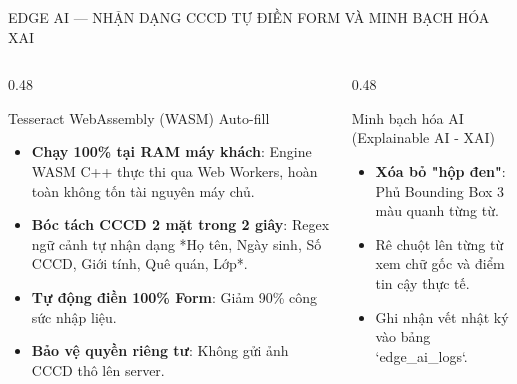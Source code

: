\documentclass[aspectratio=169, 10pt]{beamer}
\begin{document}
\begin{frame}{EDGE AI — NHẬN DẠNG CCCD TỰ ĐIỀN FORM VÀ MINH BẠCH HÓA XAI}
  \begin{columns}[T]
    \begin{column}{0.48\textwidth}
      \begin{highlightCard}{Tesseract WebAssembly (WASM) Auto-fill}
        \fontsize{6.8pt}{8.5pt}\selectfont
        \begin{itemize}
          \setlength{\itemsep}{1.5pt}
          \item \textbf{Chạy 100\% tại RAM máy khách}: Engine WASM C++ thực thi qua Web Workers, hoàn toàn không tốn tài nguyên máy chủ.
          \item \textbf{Bóc tách CCCD 2 mặt trong 2 giây}: Regex ngữ cảnh tự nhận dạng *Họ tên, Ngày sinh, Số CCCD, Giới tính, Quê quán, Lớp*.
          \item \textbf{Tự động điền 100\% Form}: Giảm 90\% công sức nhập liệu.
          \item \textbf{Bảo vệ quyền riêng tư}: Không gửi ảnh CCCD thô lên server.
        \end{itemize}
      \end{highlightCard}
    \end{column}
    \begin{column}{0.48\textwidth}
      \begin{greenCard}{Minh bạch hóa AI (Explainable AI - XAI)}
        \begin{center}
        \end{center}
        \fontsize{6.5pt}{8pt}\selectfont
        \begin{itemize}
          \setlength{\itemsep}{1pt}
          \item \textbf{Xóa bỏ "hộp đen"}: Phủ Bounding Box 3 màu quanh từng từ.
          \item Rê chuột lên từng từ xem chữ gốc và điểm tin cậy thực tế.
          \item Ghi nhận vết nhật ký vào bảng `edge\_ai\_logs`.
        \end{itemize}
      \end{greenCard}
    \end{column}
  \end{columns}
\end{frame}
\end{document}
